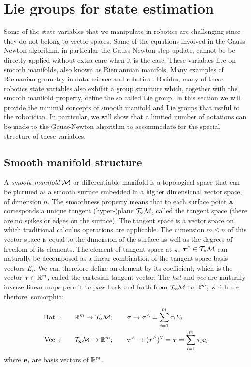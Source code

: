 \section{Lie groups for state estimation}
Some of the state variables that we manipulate in robotics are challenging since they do not belong to vector spaces. Some of the equations
involved in the Gauss-Newton algorithm, in particular the Gauss-Newton step update, cannot be be directly applied without extra care when it is the case.
These variables live on smooth manifolds, also known as Riemannian manifols. Many examples of Riemanian geometry in data science and robotics
\cite{miolane2020geomstats}. Besides, many of these robotics state variables also exhibit a group structure which, together with the smooth manifold
property, define the so called Lie group.
In this section we will provide the minimal concepts of smooth manifold and Lie groups that useful to the robotician. In particular, we will show 
that a limited number of notations can be made to the Gauss-Newton algorithm to accommodate for the special structure of these variables.

\subsection{Smooth manifold structure}
A \textit{smooth manifold} $\mathcal{M}$ or differentiable manifold is a topological space that can be pictured as a smooth surface embedded in a higher dimensional vector space, 
of dimension $n$.
The smoothness property means that to each surface point ${\bf x}$ corresponds a unique tangent (hyper-)plane $\mathcal{T}_{{\bf x}}\mathcal{M}$, called the tangent space 
(there are no spikes or edges on the surface). The tangent space is a vector space on which traditional calculus operations are applicable. The dimension $m \leq n$ of this 
vector space is equal to the dimension of the surface as well as the degrees of freedom of its elements.
The element of tangent space at $\bf_x$, ${\bm \tau}^\wedge \in \mathcal{T}_{{\bf x}}\mathcal{M}$ can naturally be decomposed as a linear combination 
of the tangent space basis vectors $E_i$. We can therefore define an element by its coefficient, which is the vector ${\bm \tau} \in \mathbb{R}^m$, called the cartesian tangent vector.
The \textit{hat} and \textit{vee} are mutually inverse linear maps permit to pass back and forth from $\mathcal{T}_{{\bf x}}\mathcal{M}$ to $\mathbb{R}^m$, which are therfore isomorphic:

\begin{align}
    \text{Hat} ~ :& \quad\quad \mathbb{R}^m \rightarrow \mathcal{T}_{{\bf x}}\mathcal{M}; \quad\quad {\bm \tau} \rightarrow {\bm \tau}^\wedge = \sum_{i=1}^m\tau_i E_i  \\
    \text{Vee} ~ :& \quad\quad \mathcal{T}_{{\bf x}}\mathcal{M} \rightarrow \mathbb{R}^m; \quad\quad {\bm \tau}^\wedge \rightarrow ({\bm \tau}^\wedge)^\vee = {\bm \tau} = \sum_{i=1}^m\tau_i {\bf e}_i
\end{align}
where ${\bf e}_i$ are basis vectors of $\mathbb{R}^m$.

